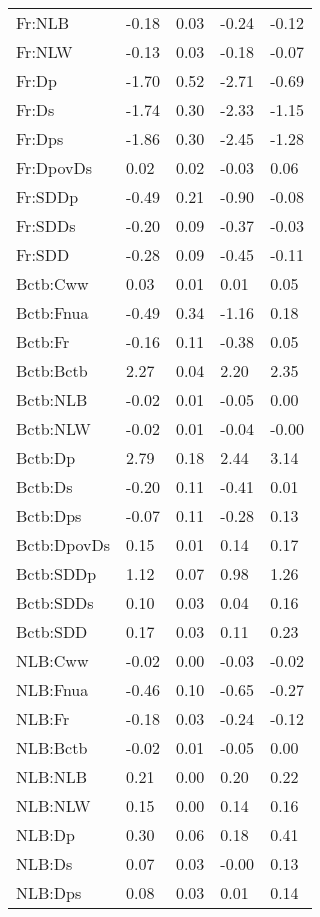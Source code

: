 \begin{center}
\begin{longtable}{|p{0.9in}|p{0.7in}|p{0.7in}|p{0.7in}|p{0.7in}|}
    Fr:NLB & -0.18 & 0.03 & -0.24 & -0.12 \\ 
    Fr:NLW & -0.13 & 0.03 & -0.18 & -0.07 \\ 
    Fr:Dp & -1.70 & 0.52 & -2.71 & -0.69 \\ 
    Fr:Ds & -1.74 & 0.30 & -2.33 & -1.15 \\ 
    Fr:Dps & -1.86 & 0.30 & -2.45 & -1.28 \\ 
    Fr:DpovDs & 0.02 & 0.02 & -0.03 & 0.06 \\ 
    Fr:SDDp & -0.49 & 0.21 & -0.90 & -0.08 \\ 
    Fr:SDDs & -0.20 & 0.09 & -0.37 & -0.03 \\ 
    Fr:SDD & -0.28 & 0.09 & -0.45 & -0.11 \\ 
    Bctb:Cww & 0.03 & 0.01 & 0.01 & 0.05 \\ 
    Bctb:Fnua & -0.49 & 0.34 & -1.16 & 0.18 \\ 
    Bctb:Fr & -0.16 & 0.11 & -0.38 & 0.05 \\ 
    Bctb:Bctb & 2.27 & 0.04 & 2.20 & 2.35 \\ 
    Bctb:NLB & -0.02 & 0.01 & -0.05 & 0.00 \\ 
    Bctb:NLW & -0.02 & 0.01 & -0.04 & -0.00 \\ 
    Bctb:Dp & 2.79 & 0.18 & 2.44 & 3.14 \\ 
    Bctb:Ds & -0.20 & 0.11 & -0.41 & 0.01 \\ 
    Bctb:Dps & -0.07 & 0.11 & -0.28 & 0.13 \\ 
    Bctb:DpovDs & 0.15 & 0.01 & 0.14 & 0.17 \\ 
    Bctb:SDDp & 1.12 & 0.07 & 0.98 & 1.26 \\ 
    Bctb:SDDs & 0.10 & 0.03 & 0.04 & 0.16 \\ 
   Bctb:SDD & 0.17 & 0.03 & 0.11 & 0.23 \\ 
   NLB:Cww & -0.02 & 0.00 & -0.03 & -0.02 \\ 
   NLB:Fnua & -0.46 & 0.10 & -0.65 & -0.27 \\ 
   NLB:Fr & -0.18 & 0.03 & -0.24 & -0.12 \\ 
   NLB:Bctb & -0.02 & 0.01 & -0.05 & 0.00 \\ 
   NLB:NLB & 0.21 & 0.00 & 0.20 & 0.22 \\ 
   NLB:NLW & 0.15 & 0.00 & 0.14 & 0.16 \\ 
   NLB:Dp & 0.30 & 0.06 & 0.18 & 0.41 \\ 
   NLB:Ds & 0.07 & 0.03 & -0.00 & 0.13 \\ 
   NLB:Dps & 0.08 & 0.03 & 0.01 & 0.14 \\ 

\end{longtable}
\end{center}
